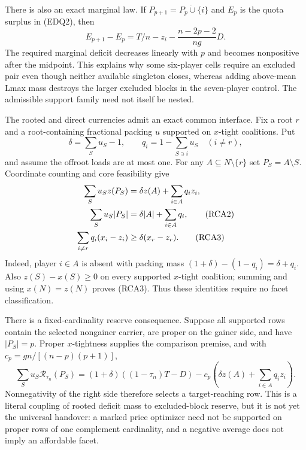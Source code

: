 \documentclass[11pt]{article}
\begin{document}
There is also an exact marginal law.  If
$P_{p+1}=P_p\mathbin{\dot\cup}\{i\}$ and $E_p$ is the quota surplus in
(EDQ2), then
\[
 E_{p+1}-E_p=T/n-z_i-\frac{n-2p-2}{ng}D.             \tag{EDQ4}
\]
The required marginal deficit decreases linearly with $p$ and becomes
nonpositive after the midpoint.  This explains why some six-player cells
require an excluded pair even though neither available singleton closes,
whereas adding above-mean Lmax mass destroys the larger excluded blocks in
the seven-player control.  The admissible support family need not itself be
nested.

The rooted and direct currencies admit an exact common interface.  Fix a
root $r$ and a root-containing fractional packing $u$ supported on
$x$-tight coalitions.  Put
\[
 \delta=\sum_Su_S-1,\qquad
 q_i=1-\sum_{S\ni i}u_S\quad(i\ne r),               \tag{RCA1}
\]
and assume the offroot loads are at most one.  For any
$A\subseteq N\setminus\{r\}$ set $P_S=A\setminus S$.  Coordinate counting
and core feasibility give
\begin{align}
 \sum_Su_Sz(P_S)&=\delta z(A)+\sum_{i\in A}q_i z_i,\notag\\
 \sum_Su_S|P_S|&=\delta |A|+\sum_{i\in A}q_i,       \tag{RCA2}\\
 \sum_{i\ne r}q_i(x_i-z_i)&\ge
             \delta(x_r-z_r).                       \tag{RCA3}
\end{align}
Indeed, player $i\in A$ is absent with packing mass
$(1+\delta)-(1-q_i)=\delta+q_i$.  Also
$z(S)-x(S)\ge0$ on every supported $x$-tight coalition; summing and using
$x(N)=z(N)$ proves (RCA3).  Thus these identities require no facet
classification.

There is a fixed-cardinality reserve consequence.  Suppose all supported
rows contain the selected nongainer carrier, are proper on the gainer side,
and have $|P_S|=p$.  Proper $x$-tightness supplies the comparison premise,
and with $c_p=gn/[(n-p)(p+1)]$,
\[
 \sum_Su_S\mathcal R_{\tau_n}(P_S)
 =(1+\delta)((1-\tau_n)T-D)
  -c_p\left(\delta z(A)+\sum_{i\in A}q_i z_i\right). \tag{RCA4}
\]
Nonnegativity of the right side therefore selects a target-reaching row.
This is a literal coupling of rooted deficit mass to excluded-block reserve,
but it is not yet the universal handover: a marked price optimizer need not
be supported on proper rows of one complement cardinality, and a negative
average does not imply an affordable facet.
\end{document}

